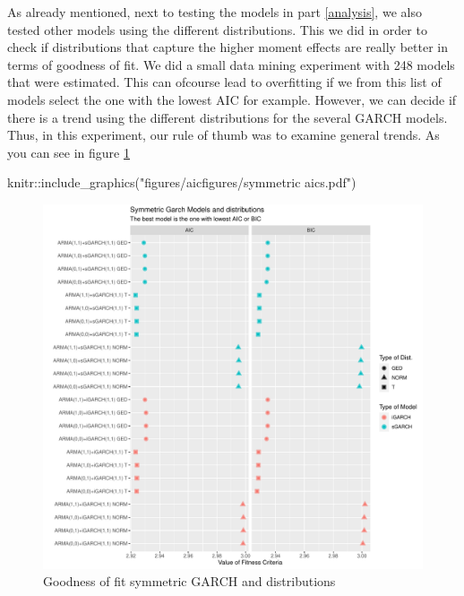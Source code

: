 \documentclass[a4paper, twoside]{templates/ociamthesis}
\newenvironment{Shaded}{\begin{snugshade}}{\end{snugshade}}
\newcommand{\FunctionTok}[1]{\textcolor[rgb]{0.00,0.00,0.00}{#1}}
\newcommand{\NormalTok}[1]{#1}
\newcommand{\SpecialCharTok}[1]{\textcolor[rgb]{0.00,0.00,0.00}{#1}}
\newcommand{\StringTok}[1]{\textcolor[rgb]{0.31,0.60,0.02}{#1}}
\renewenvironment{Shaded}
{
  \vspace{10pt}%
  \begin{snugshade}%
}{%
  \end{snugshade}%
  \vspace{8pt}%
}
\begin{document}
As already mentioned, next to testing the models in part \ref{analysis}, we also tested other models using the different distributions. This we did in order to check if distributions that capture the higher moment effects are really better in terms of goodness of fit. We did a small data mining experiment with 248 models that were estimated. This can ofcourse lead to overfitting if we from this list of models select the one with the lowest AIC for example. However, we can decide if there is a trend using the different distributions for the several GARCH models. Thus, in this experiment, our rule of thumb was to examine general trends. As you can see in figure \ref{fig:aic1}

\begin{Shaded}
\begin{Highlighting}[]
\NormalTok{knitr}\SpecialCharTok{::}\FunctionTok{include\_graphics}\NormalTok{(}\StringTok{"figures/aicfigures/symmetric aics.pdf"}\NormalTok{)}
\end{Highlighting}
\end{Shaded}

\begin{figure}

{\centering \includegraphics[width=1\linewidth]{figures/aicfigures/symmetric aics} 

}

\caption{Goodness of fit symmetric GARCH and distributions}\label{fig:aic1}
\end{figure}
\end{document}
